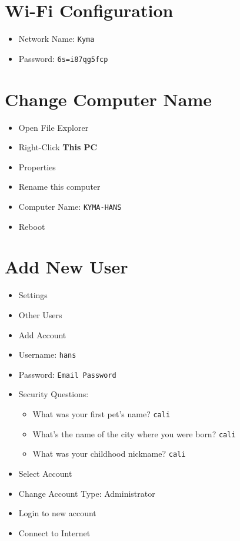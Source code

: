 \documentclass{article}
\begin{document}
\section*{Wi-Fi Configuration}
\begin{itemize}
    \item Network Name: \texttt{Kyma}
    \item Password: \texttt{6s=i87qg5fcp}
\end{itemize}

\section*{Change Computer Name}
\begin{itemize}
    \item Open File Explorer
    \item Right-Click \textbf{This PC}
    \item Properties
    \item Rename this computer
    \item Computer Name: \texttt{KYMA-HANS}
    \item Reboot
\end{itemize}

\section*{Add New User}
\begin{itemize}
    \item Settings
    \item Other Users
    \item Add Account
    \item Username: \texttt{hans}
    \item Password: \texttt{Email Password}
    \item Security Questions:
    \begin{itemize}
        \item What was your first pet's name? \texttt{cali}
        \item What's the name of the city where you were born? \texttt{cali}
        \item What was your childhood nickname? \texttt{cali}
    \end{itemize}
    \item Select Account
    \item Change Account Type: Administrator
    \item Login to new account
    \item Connect to Internet
\end{itemize}
\end{document}
